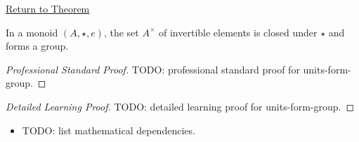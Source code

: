 \newpage
{}
\label{prf:units-form-group}

\begin{remark*}[Return]
\hyperref[prop:units-form-group]{Return to Theorem}
\end{remark*}

\begin{proposition*}
In a monoid $(A,\star,e)$, the set $A^\times$ of invertible elements is
closed under $\star$ and forms a group.
\end{proposition*}

\begin{proof}[Professional Standard Proof]
\LRAProofBodyStart
TODO: professional standard proof for units-form-group.
\end{proof}

\begin{proof}[Detailed Learning Proof]
\LRAProofBodyStart
TODO: detailed learning proof for units-form-group.
\end{proof}

\begin{remark*}
\end{remark*}

\begin{dependencies}
\begin{itemize}
  \item TODO: list mathematical dependencies.
\end{itemize}
\end{dependencies}

\clearpage
